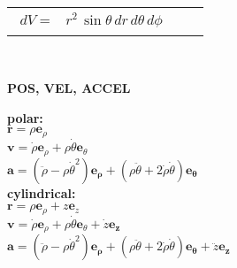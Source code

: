 \documentclass[letterpaper,landscape,10pt]{article}
\begin{document}
{\begin{multicols}{3}
\begin{center}
\begin{tabular}{ c  c  c }
			\parbox[t]{.9in}{\vspace{-15pt}
				\begin{equation*}\begin{split}
					dV =& r^2 \, \sin\theta \, dr \, d\theta \, d\phi
				\end{split}\end{equation*} } \\
		
		\end{tabular}\\
	\end{center}

	\begin{center}
		\textbf{POS, VEL, ACCEL}\\
	\end{center}
	\textbf{polar:}\\
	$\bm{\mathbf{r}} = \rho\bm{\mathbf{e}}_\rho$\\
	$\bm{\mathbf{v}} = \dot{\rho}\bm{\mathbf{e}}_\rho + \rho\dot\theta\bm{\mathbf{e}}_\theta$\\
	$\bm{\mathbf{a}} = \left(\ddot{\rho}-\rho\dot\theta^2\right)\bm{\mathbf{e}_\rho} + 
	\left( \rho\ddot\theta+2\dot{\rho}\dot\theta\right)\bm{\mathbf{e}_\theta}$\\
	\textbf{cylindrical:}\\
	$\bm{\mathbf{r}} = \rho\bm{\mathbf{e}}_\rho + z\bm{\mathbf{e}}_z$\\
	$\bm{\mathbf{v}} = \dot{\rho}\bm{\mathbf{e}}_\rho + \rho\dot\theta\bm{\mathbf{e}}_\theta + \dot{z}\bm{\mathbf{e}_z}$\\
	$\bm{\mathbf{a}} = \left(\ddot{\rho}-\rho\dot\theta^2\right)\bm{\mathbf{e}_\rho} + 
	\left( \rho\ddot\theta+2\dot{\rho}\dot\theta\right)\bm{\mathbf{e}_\theta} +
	\ddot{z}\bm{\mathbf{e}_z}$


\end{multicols}}
\end{document}
